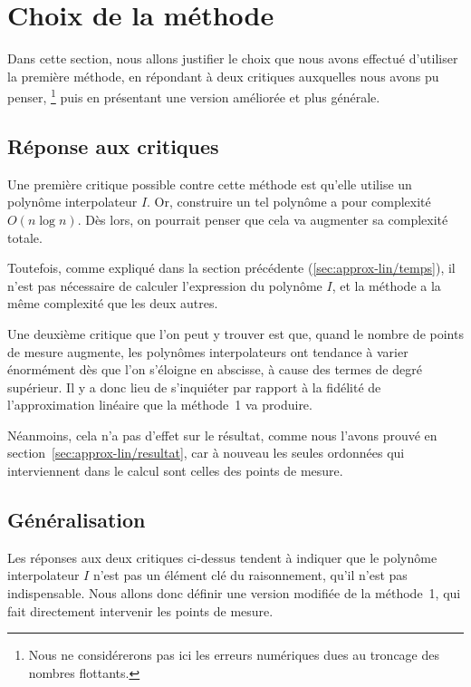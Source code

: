 \section{Choix de la méthode}

Dans cette section, nous allons justifier
le choix que nous avons effectué d'utiliser la première méthode,
en répondant à deux critiques auxquelles nous avons pu penser,%
\footnote{
    Nous ne considérerons pas ici les erreurs numériques
    dues au troncage des nombres flottants.
}
puis en présentant une version améliorée et plus générale.

\subsection{Réponse aux critiques}

Une première critique possible contre cette méthode
est qu'elle utilise un polynôme interpolateur $I$.
Or, construire un tel polynôme a pour complexité $O(n\log n)$.
\cite{lagrange-complexity}
Dès lors, on pourrait penser que cela va augmenter sa complexité totale.

Toutefois, comme expliqué dans la section précédente
(\ref{sec:approx-lin/temps}),
il n'est pas nécessaire de calculer l'expression du polynôme $I$,
et la méthode a la même complexité que les deux autres.

Une deuxième critique que l'on peut y trouver est que,
quand le nombre de points de mesure augmente,
les polynômes interpolateurs ont tendance à varier énormément
dès que l'on s'éloigne en abscisse,
à cause des termes de degré supérieur.
Il y a donc lieu de s'inquiéter par rapport à la fidélité
de l'approximation linéaire que la méthode~1 va produire.

Néanmoins, cela n'a pas d'effet sur le résultat, comme nous l'avons
prouvé en section~\ref{sec:approx-lin/resultat},
car à nouveau les seules ordonnées qui interviennent dans le calcul
sont celles des points de mesure.

\subsection{Généralisation}

Les réponses aux deux critiques ci-dessus tendent à indiquer
que le polynôme interpolateur $I$ n'est pas un élément clé du raisonnement,
qu'il n'est pas indispensable.
Nous allons donc définir une version modifiée de la méthode~1,
qui fait directement intervenir les points de mesure.

